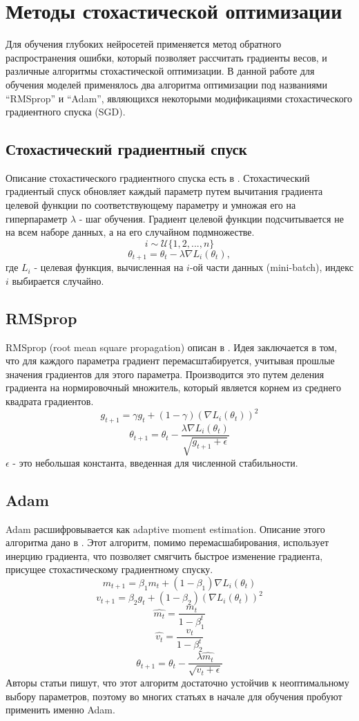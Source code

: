 \clearpage
\section{Методы стохастической оптимизации}
	Для обучения глубоких нейросетей применяется метод обратного распространения ошибки, который позволяет рассчитать градиенты весов, и различные алгоритмы стохастической оптимизации. В данной работе для обучения моделей применялось два алгоритма оптимизации под названиями ``RMSprop'' и ``Adam'', являющихся некоторыми модификациями стохастического градиентного спуска (SGD).
	\subsection{Стохастический градиентный спуск}
		Описание стохастического градиентного спуска есть в \cite{sgd}. Стохастический градиентый спуск обновляет каждый параметр путем вычитания градиента целевой функции по соответствующему параметру и умножая его на гиперпараметр $\lambda$ - шаг обучения. Градиент целевой функции подсчитывается не на всем наборе данных, а на его случайном подмножестве.
		$$ i \sim \mathcal{U}\{1, 2, ..., n\} $$
		$$ \theta_{t+1} = \theta_t - \lambda \nabla L_i(\theta_t), $$
		где $L_i$ - целевая функция, вычисленная на $i$-ой части данных (mini-batch), индекс $i$ выбирается случайно.
	\subsection{RMSprop}
		RMSprop (root mean square propagation) описан в \cite{rmsprop}. Идея заключается в том, что для каждого параметра градиент перемасштабируется, учитывая прошлые значения градиентов для этого параметра. Производится это путем деления градиента на нормировочный множитель, который является корнем из среднего квадрата градиентов.
		$$ g_{t+1} = \gamma g_t + (1 - \gamma) (\nabla L_i(\theta_t))^2$$
		$$ \theta_{t+1} = \theta_t - \frac{\lambda \nabla L_i(\theta_t)}{\sqrt{g_{t+1} + \epsilon}} $$
		$\epsilon$ - это небольшая константа, введенная для численной стабильности.
	\subsection{Adam}
		Adam расшифровывается как adaptive moment estimation. Описание этого алгоритма дано в \cite{adam}. Этот алгоритм, помимо перемасшабирования, использует инерцию градиента, что позволяет смягчить быстрое изменение градиента, присущее стохастическому градиентному спуску.
		$$ m_{t+1} = \beta_1 m_t + (1 - \beta_1) \nabla L_i(\theta_t) $$
		$$ v_{t+1} = \beta_2 g_t + (1 - \beta_2) (\nabla L_i(\theta_t))^2 $$
		$$ \hat{m_t} = \frac{m_t}{1 - \beta_1^t} $$
		$$ \hat{v_t} = \frac{v_t}{1 - \beta_2^t}$$
		$$ \theta_{t+1} = \theta_t - \frac{\lambda \hat{m_t}}{\sqrt{v_t + \epsilon}} $$
		Авторы статьи \cite{adam} пишут, что этот алгоритм достаточно устойчив к неоптимальному выбору параметров, поэтому во многих статьях в начале для обучения пробуют применить именно Adam.